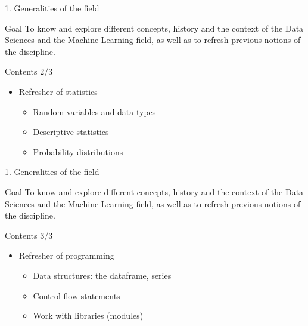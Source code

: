 \documentclass[
  ignorenonframetext,
]{beamer}
\providecommand{\tightlist}{%
  \setlength{\itemsep}{0pt}\setlength{\parskip}{0pt}}\usepackage{longtable,booktabs,array}
\begin{document}
\begin{frame}{1. Generalities of the field}
\protect\hypertarget{generalities-of-the-field-1}{}
\begin{alertblock}{Goal}
\protect\hypertarget{goal-2}{}
To know and explore different concepts, history and the context of the
Data Sciences and the Machine Learning field, as well as to refresh
previous notions of the discipline.
\end{alertblock}

\begin{exampleblock}{Contents 2/3}
\protect\hypertarget{contents-23}{}
\begin{itemize}
\tightlist
\item
  Refresher of statistics

  \begin{itemize}
  \tightlist
  \item
    Random variables and data types
  \item
    Descriptive statistics
  \item
    Probability distributions
  \end{itemize}
\end{itemize}
\end{exampleblock}
\end{frame}

\begin{frame}{1. Generalities of the field}
\protect\hypertarget{generalities-of-the-field-2}{}
\begin{alertblock}{Goal}
\protect\hypertarget{goal-3}{}
To know and explore different concepts, history and the context of the
Data Sciences and the Machine Learning field, as well as to refresh
previous notions of the discipline.
\end{alertblock}

\begin{exampleblock}{Contents 3/3}
\protect\hypertarget{contents-33}{}
\begin{itemize}
\tightlist
\item
  Refresher of programming

  \begin{itemize}
  \tightlist
  \item
    Data structures: the dataframe, series
  \item
    Control flow statements
  \item
    Work with libraries (modules)
  \end{itemize}
\end{itemize}
\end{exampleblock}
\end{frame}
\end{document}
